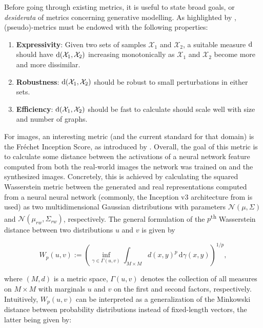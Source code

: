 Before going through existing metrics, it is useful to state broad goals, or
\emph{desiderata} of metrics concerning generative modelling. As highlighted by
\cite{o2021evaluation}, (pseudo)-metrics must be endowed with the following
properties:

\begin{enumerate}
\item \textbf{Expressivity}: Given two sets of samples $\mathcal{X}_1$ and
$\mathcal{X}_2$, a suitable measure $\text{d}$ should have
$\text{d}(\mathcal{X}_1,\mathcal{X}_2)$ increasing monotonically as
$\mathcal{X}_1$ and $\mathcal{X}_2$ become more and more dissimilar.
\item \textbf{Robustness}: $\text{d}(\mathcal{X}_1,\mathcal{X}_2)$ should be
robust to small perturbations in either sets.
\item \textbf{Efficiency}: $\text{d}(\mathcal{X}_1,\mathcal{X}_2)$ should be
fast to calculate should scale well with size and number of graphs.
\end{enumerate}


For images, an interesting metric (and the current standard for that domain) is
the Fr\'echet Inception Score, as introduced by \cite{heusel2017gans}. Overall,
the goal of this metric is to calculate some distance between the activations of
a neural network feature computed from both the real-world images the network
was trained on and the synthesized images. Concretely, this is achieved by
calculating the squared Wasserstein metric between the generated and real
representations computed from a neural neural network (commonly, the Inception
v3 architecture from \cite{szegedy2015rethinking} is used) as two
multidimensional Gaussian distributions with parameters $\mathcal{N}(\mu,
\Sigma)$ and $\mathcal{N}(\mu_{rw}, \Sigma_{rw})$, respectively. The general
formulation of the $p$\textsuperscript{th} Wasserstein distance between two
distributions $u$ and $v$ is given by

\begin{equation}
  \label{eq:wasserstein_distance} W_p(u,v) := \left(\inf _{\gamma \in \Gamma
(u,v)}\int _{M\times M}d(x,y)^{p}\,\mathrm {d} \gamma (x,y)\right)^{1/p},
\end{equation}

where $(M, d)$ is a metric space, $\Gamma (u,v)$ denotes the collection of all
measures on $M\times M$ with marginals $u$ and $v$ on the first and second
factors, respectively. Intuitively, $W_p(u,v)$ can be interpreted as a
generalization of the Minkowski distance between probability distributions
instead of fixed-length vectors, the latter being given by:

